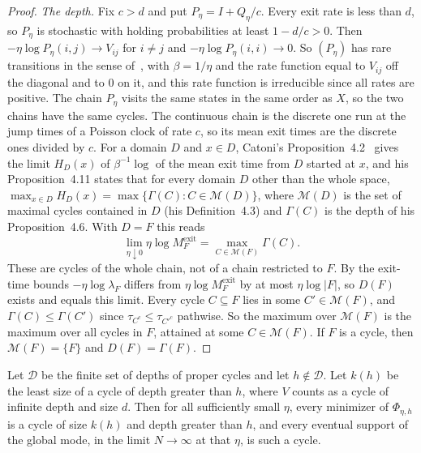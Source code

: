 \begin{proof}
\emph{The depth.} Fix $c>d$ and put $P_\eta=I+Q_\eta/c$. Every exit rate is
less than $d$, so $P_\eta$ is stochastic with holding probabilities at least
$1-d/c>0$. Then $-\eta\log P_\eta(i,j)\to V_{ij}$ for $i\ne j$ and
$-\eta\log P_\eta(i,i)\to0$. So $(P_\eta)$ has rare transitions in the sense
of~\cite[Definition~2.1]{catoni1999}, with $\beta=1/\eta$ and the rate function
equal to $V_{ij}$ off the diagonal and to $0$ on it, and this rate function is
irreducible since all rates are positive. The chain $P_\eta$
visits the same states in the same order as $X$, so the two chains have the
same cycles. The continuous chain is the discrete one run at the jump times of
a Poisson clock of rate $c$, so its mean exit times are the discrete ones
divided by $c$. For a domain $D$ and $x\in D$, Catoni's
Proposition~4.2~\cite{catoni1999} gives the limit $H_D(x)$ of $\beta^{-1}\log$ of
the mean exit time from $D$ started at $x$, and his Proposition~4.11 states that
for every domain $D$ other than the whole space,
$\max_{x\in D}H_D(x)=\max\{\Gamma(C):C\in\mathcal M(D)\}$, where $\mathcal M(D)$
is the set of maximal cycles contained in $D$ (his Definition~4.3) and
$\Gamma(C)$ is the depth of his Proposition~4.6. With $D=F$ this reads
\[
 \lim_{\eta\downarrow0}\eta\log M^{\mathrm{exit}}_F=\max_{C\in\mathcal M(F)}\Gamma(C).
\] These
are cycles of the whole chain, not of a chain restricted to $F$. By the
exit-time bounds $-\eta\log\lambda_F$ differs from $\eta\log M^{\mathrm{exit}}_F$
by at most $\eta\log|F|$, so $D(F)$ exists and equals this limit. Every cycle
$C\subseteq F$ lies in some $C'\in\mathcal M(F)$, and $\Gamma(C)\le\Gamma(C')$
since $\tau_{C^c}\le\tau_{C'^c}$ pathwise. So the maximum over $\mathcal M(F)$
is the maximum over all cycles in $F$, attained at some $C\in\mathcal M(F)$. If
$F$ is a cycle, then $\mathcal M(F)=\{F\}$ and $D(F)=\Gamma(F)$.
\end{proof}

\begin{theorem}\label{thm:noncritical}
Let $\mathcal D$ be the finite set of depths of proper cycles and let
$h\notin\mathcal D$. Let $k(h)$ be the least size of a cycle of depth greater
than $h$, where $V$ counts as a cycle of infinite depth and size $d$. Then for
all sufficiently small $\eta$, every minimizer of $\Phi_{\eta,h}$ is a cycle of
size $k(h)$ and depth greater than $h$, and every eventual support of the
global mode, in the limit $N\to\infty$ at that $\eta$, is such a cycle.
\end{theorem}

